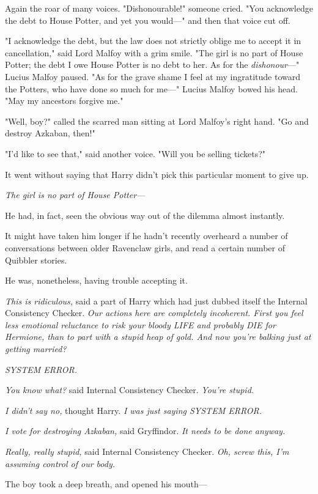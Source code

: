 Again the roar of many voices. "Dishonourable!" someone cried. "You acknowledge
the debt to House Potter, and yet you would—" and then that voice cut off.

"I acknowledge the debt, but the law does not strictly oblige me to accept it
in cancellation," said Lord Malfoy with a grim smile. "The girl is no part of
House Potter; the debt I owe House Potter is no debt to her. As for the
\emph{dishonour}—" Lucius Malfoy paused. "As for the grave shame I feel at my
ingratitude toward the Potters, who have done so much for me—" Lucius Malfoy
bowed his head. "May my ancestors forgive me."

"Well, boy?" called the scarred man sitting at Lord Malfoy's right hand. "Go
and destroy Azkaban, then!"

"I'd like to see that," said another voice. "Will you be selling tickets?"

It went without saying that Harry didn't pick this particular moment to give up.

\emph{The girl is no part of House Potter—}

He had, in fact, seen the obvious way out of the dilemma almost instantly.

It might have taken him longer if he hadn't recently overheard a number of
conversations between older Ravenclaw girls, and read a certain number of
Quibbler stories.

He was, nonetheless, having trouble accepting it.

\emph{This is ridiculous,} said a part of Harry which had just dubbed itself
the Internal Consistency Checker. \emph{Our actions here are completely
incoherent. First you feel less emotional reluctance to risk your bloody LIFE
and probably DIE for Hermione, than to part with a stupid heap of gold. And now
you're balking just at getting married?}

\emph{SYSTEM ERROR.}

\emph{You know what?} said Internal Consistency Checker. \emph{You're stupid.}

\emph{I didn't say no,} thought Harry. \emph{I was just saying SYSTEM ERROR.}

\emph{I vote for destroying Azkaban,} said Gryffindor. \emph{It needs to be
done anyway.}

\emph{Really, really stupid,} said Internal Consistency Checker. \emph{Oh,
screw this, I'm assuming control of our body.}

The boy took a deep breath, and opened his mouth—

